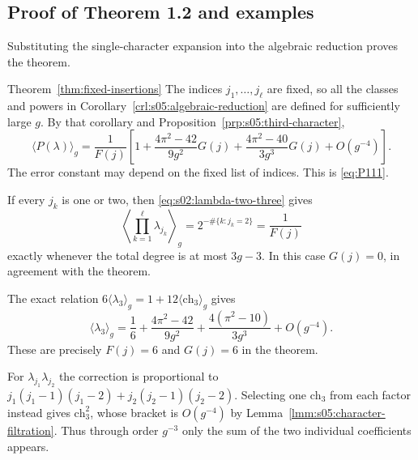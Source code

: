 \subsection{Proof of Theorem 1.2 and examples}
\label{subsec:s05:03}

Substituting the single-character expansion into the algebraic
reduction proves the theorem.

\begin{prfn}{Theorem~\ref{thm:fixed-insertions}}
The indices $j_1,\ldots,j_\ell$ are fixed, so all the classes and
powers in Corollary~\ref{crl:s05:algebraic-reduction} are defined
for sufficiently large $g$. By that corollary and
Proposition~\ref{prp:s05:third-character},
\[
 \langle P(\lambda)\rangle_g
 =\frac1{F(j)}\left[
 1+\frac{4\pi^2-42}{9g^2}G(j)
  +\frac{4\pi^2-40}{3g^3}G(j)+O(g^{-4})\right].
\]
The error constant may depend on the fixed list of indices.
This is \eqref{eq:P111}.
\end{prfn}

\begin{exm}
If every $j_k$ is one or two, then
\eqref{eq:s02:lambda-two-three} gives
\[
 \left\langle\prod_{k=1}^{\ell}\lambda_{j_k}\right\rangle_g
 =2^{-\#\{k:j_k=2\}}=\frac1{F(j)}
\]
exactly whenever the total degree is at most $3g-3$.
In this case $G(j)=0$, in agreement with the theorem.
\end{exm}

\begin{exm}
The exact relation
$6\langle\lambda_3\rangle_g=1+12\langle\mathrm{ch}_3\rangle_g$
gives
\[
 \langle\lambda_3\rangle_g
 =\frac16+\frac{4\pi^2-42}{9g^2}
          +\frac{4(\pi^2-10)}{3g^3}+O(g^{-4}).
\]
These are precisely $F(j)=6$ and $G(j)=6$ in the theorem.
\end{exm}

\begin{exm}
For $\lambda_{j_1}\lambda_{j_2}$ the correction is proportional to
$j_1(j_1-1)(j_1-2)+j_2(j_2-1)(j_2-2)$.
Selecting one $\mathrm{ch}_3$ from each factor instead gives
$\mathrm{ch}_3^2$, whose bracket is $O(g^{-4})$ by
Lemma~\ref{lmm:s05:character-filtration}. Thus through order
$g^{-3}$ only the sum of the two individual coefficients appears.
\end{exm}
